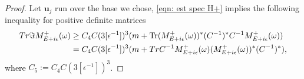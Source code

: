 \documentclass[10pt,a4paper]{amsart}
\DeclareMathOperator{\Tr}{{\rm Tr}}
\newcommand{\tr}{{\rm Tr}}
\begin{document}
\begin{proof}
Let $\mathbf{u}_j$ run over the base we chose,  \eqref{eqn: est spec H+} implies the following inequality for positive definite matrices
\begin{equation*}
\begin{aligned}
	\tr\Im M_{E+i\epsilon}^+(\omega)&\geq  C_4C(3[\epsilon^{-1}])^3(m+\Tr(M_{E+i\epsilon}^+(\omega))^\ast(C^{-1})^*C^{-1} M_{E+i\epsilon}^+(\omega))\\
	&= C_4C(3[\epsilon^{-1}])^3(m+\tr C^{-1} M_{E+i\epsilon}^+(\omega)(M_{E+i\epsilon}^+(\omega))^\ast(C^{-1})^*),
\end{aligned}
\end{equation*}
where $C_5:=C_4C(3[\epsilon^{-1}])^3$.
\end{proof}
\end{document}
